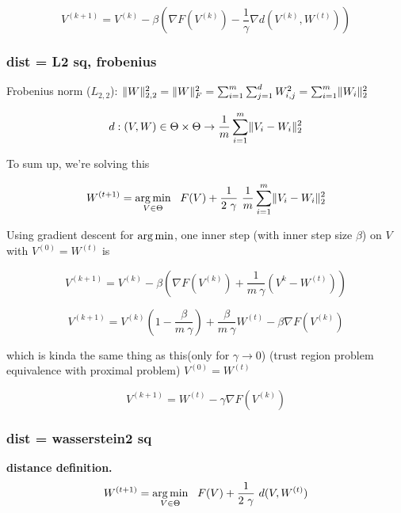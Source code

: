 \begin{equation}
	V^{(k+1)} = V^{(k)} - \beta \left(\nabla F(V^{(k)}) - \frac{1}{\gamma} \nabla d(V^{(k)}, W^{(t)})\right)
\end{equation}

\subsubsection{dist = L2 sq, frobenius}

Frobenius norm ($L_{2,2}$): $\lVert W\rVert_{2,2}^2 = \lVert W\rVert_F^2 = \sum_{i=1}^{m} \sum_{j=1}^{d} W_{i, j}^2 = \sum_{i=1}^{m} \lVert W_i\rVert_2^2$

\begin{equation}
	d : (V, W) \in \Theta \times \Theta \rightarrow \frac{1}{m} \sum_{i=1}^{m} \lVert V_i - W_i\rVert^2_2
\end{equation}

To sum up, we're solving this 

\begin{equation}
	W^{(t+1)} = \argmin_{V \in \Theta} \ \  F(V) + \frac{1}{2 ~ \gamma} ~ \frac{1}{m} \sum_{i=1}^{m} \norm{V_i - W_i}^2_2
\end{equation}

Using gradient descent for $\operatorname*{arg\,min}$, one inner step (with inner step size $\beta$) on $V$ with $V^{(0)} = W^{(t)}$ is

\begin{equation}
	V^{(k+1)} = V^{(k)} - \beta \left(\nabla F(V^{(k)}) + \frac{1}{m ~ \gamma} (V^{k} - W^{(t)}) \right) 
\end{equation}

\begin{equation}
	V^{(k+1)} = V^{(k)}\left(1 - \frac{\beta}{m ~ \gamma}\right) + \frac{\beta}{m ~ \gamma} W^{(t)}   - \beta \nabla F(V^{(k)})
\end{equation}

which is kinda the same thing as this(only for $\gamma \rightarrow 0$) (trust region problem equivalence with proximal problem) $V^{(0)} = W^{(t)}$

\begin{equation}
	V^{(k+1)} = W^{(t)} - \gamma \nabla F(V^{(k)})
\end{equation}

\subsubsection{dist = wasserstein2 sq}

\textbf{distance definition.}
\begin{equation}
	W^{(t+1)} = \operatorname*{arg\,min}_{V \in \Theta} \ \  F(V) + \frac{1}{2 ~ \gamma} ~ d(V, W^{(t)})
\end{equation}


